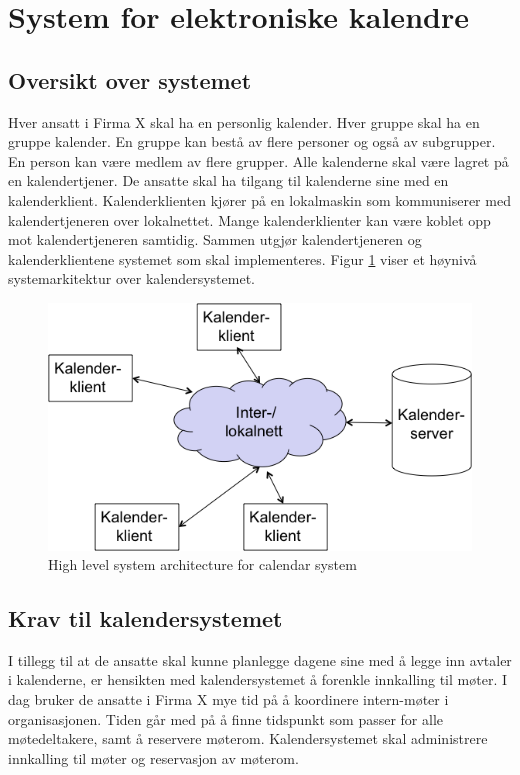 \section{System for elektroniske kalendre}
\subsection{Oversikt over systemet}

Hver ansatt i Firma X skal ha en personlig kalender. Hver gruppe skal ha en gruppe kalender. En gruppe kan bestå av flere personer og også av subgrupper. En person kan være medlem av flere grupper. Alle kalenderne skal være lagret på en kalendertjener. De ansatte skal ha tilgang til kalenderne sine med en kalenderklient. Kalenderklienten kjører på en lokalmaskin som kommuniserer med kalendertjeneren over lokalnettet. Mange kalenderklienter kan være koblet opp mot kalendertjeneren samtidig. Sammen utgjør kalendertjeneren og kalenderklientene systemet som skal implementeres.
Figur \ref{fig:high-level-architecture}  viser et høynivå systemarkitektur over kalendersystemet.

\begin{figure}[H]
    \centering
    \includegraphics[scale=0.5]{resources/high-level-architecture.png}
    \caption{High level system architecture for calendar system}
    \label{fig:high-level-architecture}
\end{figure}

\subsection{Krav til kalendersystemet}

I tillegg til at de ansatte skal kunne planlegge dagene sine med å legge inn avtaler i kalenderne, er hensikten med kalendersystemet å forenkle innkalling til møter. I dag bruker de ansatte i Firma X mye tid på å koordinere intern-møter i organisasjonen. Tiden går med på å finne tidspunkt som passer for alle møtedeltakere, samt å reservere møterom. Kalendersystemet skal administrere innkalling til møter og reservasjon av møterom.

